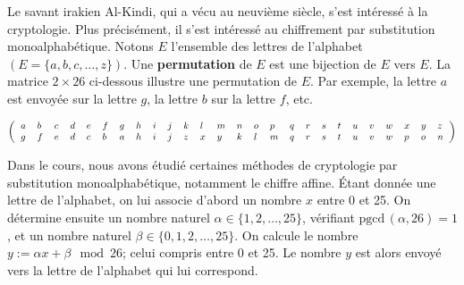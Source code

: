 \documentclass{Preparation}
\begin{document}
   \begin{question}
  Le savant irakien Al-Kindi, qui a vécu au neuvième siècle, s'est intéressé à la cryptologie. Plus précisément, il s'est intéressé au chiffrement par substitution monoalphabétique. Notons $E$ l'ensemble des lettres de l'alphabet\,$\left(E=\{a,b,c,\ldots,z\}\right)$. Une \textbf{permutation} de $E$ est une bijection de $E$ vers $E$. La matrice $2\times 26$ ci-dessous illustre une permutation de $E$. Par exemple, la lettre $a$ est envoyée sur la lettre $g$, la lettre $b$ sur la lettre $f$, etc.
    \begin{center}
    {\small
    \begin{displaymath}\left(
    \begin{tabular}{llllllllllllllllllll}
    $a$ & $b$ & $c$ & $d $&$ e $& $f$ & $g$ & $h$ & $i$ & $j$ & $k$ & $l$ & $m$\\
    $g$ & $f$ & $e $& $d$ & $c$ & $b $&$ a $& $h$ &$ i$ &$ j$ &$ z $&$ x $& $y $ 
    \end{tabular}
    \begin{tabular}{llllllllllllllllllll}
    $n$ & $o$ & $p$ & $q$ & $r$ & $s$ & $t$ & $u$ & $v$ & $w$ & $x$ & $y$ & $z $\\
    $k$ & $l$ & $m$ & $q$ & $r$ & $s$ & $t$ & $u$ & $v$ & $w $&$ p$ &$ o$ & $n$  
    \end{tabular}
    \right)
    \end{displaymath}}
    \end{center}
    Dans le cours, nous avons étudié certaines méthodes de cryptologie par substitution monoalphabétique, notamment le chiffre affine. Étant donnée une lettre de l'alphabet, on lui associe d'abord un nombre $x$ entre 0 et 25. On détermine ensuite un nombre naturel $\alpha\in\{1,2,\ldots,25\}$, vérifiant $\text{pgcd}\,(\alpha,26)=1$, et un nombre naturel $\beta\in\{0,1,2,\ldots,25\}$. On calcule le nombre $y:=\alpha x+\beta \mod 26$; celui compris entre 0 et 25. Le nombre $y$ est alors envoyé vers la lettre de l'alphabet qui lui correspond.
    
\end{question}
\end{document}
